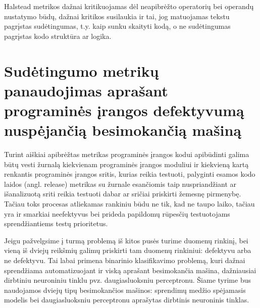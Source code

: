 \documentclass{VUMIFPSbakalaurinis}
\begin{document}
Halstead metrikos dažnai kritikuojamas dėl neapibrėžto operatorių bei operandų nustatymo būdų, dažnai kritikos susilaukia ir tai, jog matuojamas tekstu pagrįstas sudėtingumas, t.y. kaip sunku skaityti kodą, o ne sudėtingumas pagrįstas kodo struktūra ar logika.

\section{Sudėtingumo metrikų panaudojimas aprašant programinės įrangos defektyvumą nuspėjančią besimokančią mašiną}

Turint aiškiai apibrėžtas metrikas programinės įrangos kodui apibūdinti galima būtų vesti žurnalą kiekvienam programinės įrangos moduliui ir kiekvieną kartą renkantis programinės įrangos sritis, kurias reikia testuoti, palyginti esamos kodo laidos (angl. release) metrikas su žurnale esančiomis taip nuspriandžiant ar išanalizuotą sriti reikia testuoti dabar ar sričiai priskirti žemesnę pirmenybę. Tačiau toks procesas atliekamas rankiniu būdu ne tik, kad ne taupo laiko, tačiau yra ir smarkiai neefektyvus bei prideda papildomų rūpesčių testuotojams sprendžiantiems testų prioritetus.

Jeigu pažvelgsime į turmą problemą iš kitos pusės turime duomenų rinkinį, bei vieną iš dviejų reikšmių galimų priskirti tam duomenų rinkiniui: defektyvu arba ne defektyvu. Tai labai primena binarinio klasifikavimo problemą, kuri dažnai sprendžiama automatizuojant ir viską aprašant besimokančia mašina, dažniausiai dirbtiniu neuroniniu tinklu pvz. daugiasluoksniu perceptronu. Šiame tyrime bus naudojamos dviejų tipų besimokančios mašinos: sprendimų medžio spėjamasis modelis bei daugiasluoksniu perceptronu aprašytas dirbtinis neuroninis tinklas.
\end{document}
